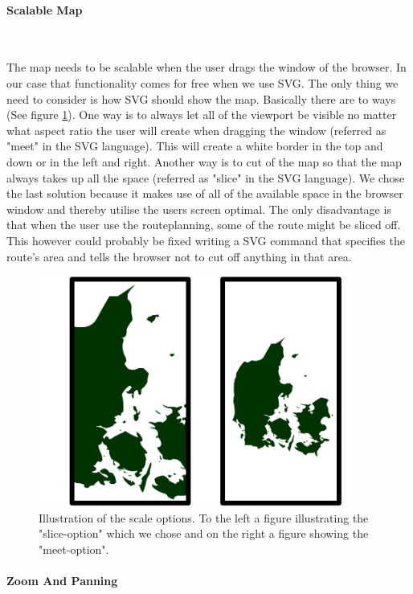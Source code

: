 \documentclass[a4paper,10pt,titlepage]{article}
\begin{document}
\paragraph{Scalable Map}\mbox{}\

The map needs to be scalable when the user drags the window of the browser. In our case that functionality comes for free when we use SVG. The only thing we need to consider is how SVG should show the map. Basically there are to ways (See figure \ref{fig:mapSliceMeet}). One way is to always let all of the viewport be visible no matter what aspect ratio the user will create when dragging the window (referred as "meet" in the SVG language). This will create a white border in the top and down or in the left and right. Another way is to cut of the map so that the map always takes up all the space (referred as "slice" in the SVG language). We chose the last solution because it makes use of all of the available space in the browser window and thereby utilise the users screen optimal. The only disadvantage is that when the user use the routeplanning, some of the route might be sliced off. This however could probably be fixed writing a SVG command that specifies the route's area and tells the browser not to cut off anything in that area.
\begin{figure}[H]
\includegraphics[width=100mm]{mapSliceMeet.png}
\caption{Illustration of the scale options. To the left a figure illustrating the "slice-option" which we chose and on the right a figure showing the "meet-option".}
\label{fig:mapSliceMeet}
\end{figure}


\paragraph{Zoom And Panning}\mbox{}\
\end{document}
